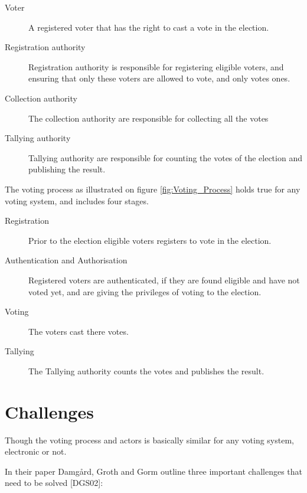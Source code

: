 \begin{description}
    \item[Voter] A registered voter that has the right to cast a vote in the election.  
    
    \item[Registration authority] Registration authority is responsible for registering eligible voters, and ensuring that
    only these voters are allowed to vote, and only votes ones. 
        
    \item[Collection authority] The collection authority are responsible for collecting all the votes

    \item[Tallying authority] Tallying authority are responsible for counting the votes of the election and publishing the result. 
\end{description}


\noindent
The voting process as illustrated on figure \ref{fig:Voting_Process} holds true for any voting system, and includes four stages. 

\begin{description}
    \item[Registration] Prior to the election eligible voters registers to vote in the election. 
    
    \item[Authentication and Authorisation] Registered voters are authenticated, if they are found eligible and have not voted yet, and are giving the privileges of voting to the election. 
        
    \item[Voting] The voters cast there votes. 

    \item[Tallying] The Tallying authority counts the votes and publishes the result. 
\end{description}


\section{Challenges}
Though the voting process and actors is basically similar for any voting system, electronic or not. 


In their paper Damgård, Groth and Gorm outline three important challenges
that need to be solved [DGS02]:

